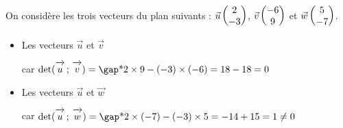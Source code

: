\documentclass[10pt,a4paper,openany,twoside, prof]{book}
\begin{document}

\begin{ex}{}{}
	On considère les trois vecteurs du plan suivants : $\vec{u}\begin{pmatrix}2\\-3\end{pmatrix}$, $\vec{v}\begin{pmatrix}-6\\9\end{pmatrix}$ et $\vec{w}\begin{pmatrix}5\\-7\end{pmatrix}$.
	\begin{itemize}
		\item  Les vecteurs $\vec{u}$ et $\vec{v}$ 

		car $\det{\vecu}{\vecv} = \troum{2\times9-(-3)\times(-6)=18-18=0}$
		\item  Les vecteurs $\vec{u}$ et $\vec{w}$ 

		car $\det{\vecu}{\vecw} = \troum{2\times(-7)-(-3)\times5=-14+15=1\neq0}$
	\end{itemize}
\end{ex}
\end{document}

